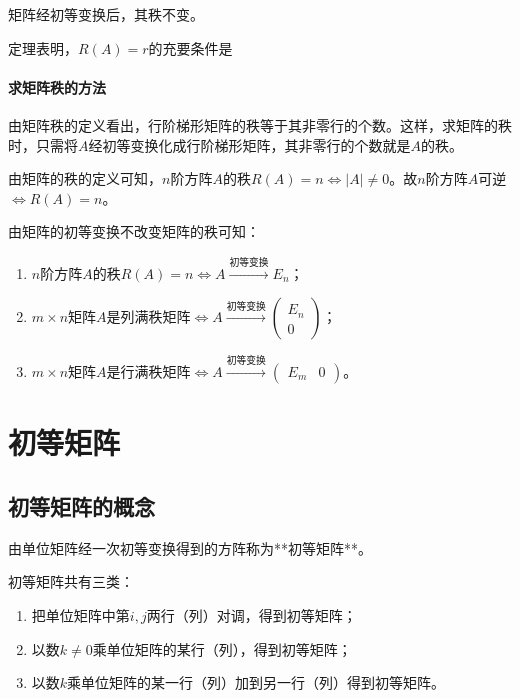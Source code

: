 \begin{theorem}
矩阵经初等变换后，其秩不变。
\end{theorem}

定理表明，$R(A)=r$的充要条件是%

\paragraph{求矩阵秩的方法}
由矩阵秩的定义看出，行阶梯形矩阵的秩等于其非零行的个数。这样，求矩阵的秩时，只需将$A$经初等变换化成行阶梯形矩阵，其非零行的个数就是$A$的秩。

由矩阵的秩的定义可知，$n$阶方阵$A$的秩$R(A)=n\Leftrightarrow|A|\neq0$。故$n$阶方阵$A$可逆$\Leftrightarrow R(A)=n$。

由矩阵的初等变换不改变矩阵的秩可知：
\begin{enumerate}
    \item $n$阶方阵$A$的秩$R(A)=n\Leftrightarrow A\xrightarrow{\text{初等变换}} E_n$；
    \item $m\times n$矩阵$A$是列满秩矩阵$\Leftrightarrow A\xrightarrow{\text{初等变换}} \begin{pmatrix} E_n \\ 0 \end{pmatrix}$；
    \item $m\times n$矩阵$A$是行满秩矩阵$\Leftrightarrow A\xrightarrow{\text{初等变换}} \begin{pmatrix} E_m & 0 \end{pmatrix}$。
\end{enumerate}


\section{初等矩阵}

\subsection{初等矩阵的概念}
\begin{definition}
由单位矩阵经一次初等变换得到的方阵称为**初等矩阵**。
\end{definition}

初等矩阵共有三类：
\begin{enumerate}
    \item 把单位矩阵中第$i,j$两行（列）对调，得到初等矩阵；
    \item 以数$k\neq0$乘单位矩阵的某行（列），得到初等矩阵；
    \item 以数$k$乘单位矩阵的某一行（列）加到另一行（列）得到初等矩阵。
\end{enumerate}

